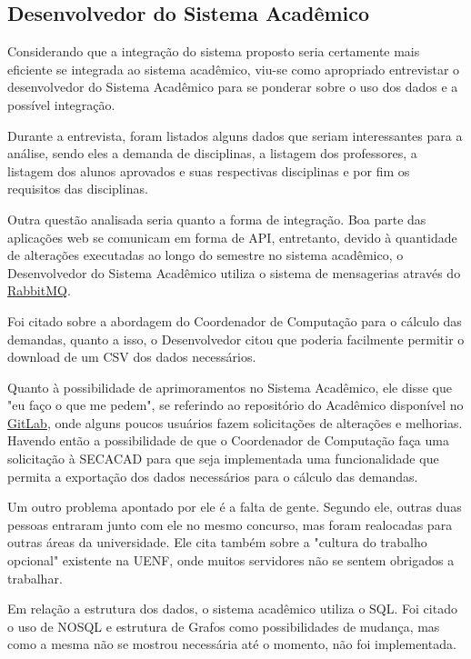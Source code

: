 \subsection{Desenvolvedor do Sistema Acadêmico} %

Considerando que a integração do sistema proposto seria certamente mais eficiente se integrada ao sistema acadêmico, viu-se como apropriado entrevistar o desenvolvedor do Sistema Acadêmico para se ponderar sobre o uso dos dados e a possível integração.

Durante a entrevista, foram listados alguns dados que seriam interessantes para a análise, sendo eles a demanda de disciplinas, a listagem dos professores, a listagem dos alunos aprovados e suas respectivas disciplinas e por fim os requisitos das disciplinas.


Outra questão analisada seria quanto a forma de integração. Boa parte das aplicações web se comunicam em forma de API, entretanto, devido à quantidade de alterações executadas ao longo do semestre no sistema acadêmico, o Desenvolvedor do Sistema Acadêmico utiliza o sistema de mensagerias através do \href{https://www.rabbitmq.com/}{RabbitMQ}.

Foi citado sobre a abordagem do Coordenador de Computação para o cálculo das demandas, quanto a isso, o Desenvolvedor citou que poderia facilmente permitir o download de um CSV dos dados necessários.

Quanto à possibilidade de aprimoramentos no Sistema Acadêmico, ele disse que "eu faço o que me pedem", se referindo ao repositório do Acadêmico disponível no \href{https://about.gitlab.com/}{GitLab}, onde alguns poucos usuários fazem solicitações de alterações e melhorias. Havendo então a possibilidade de que o Coordenador de Computação faça uma solicitação à SECACAD para que seja implementada uma funcionalidade que permita a exportação dos dados necessários para o cálculo das demandas.

Um outro problema apontado por ele é a falta de gente. Segundo ele, outras duas pessoas entraram junto com ele no mesmo concurso, mas foram realocadas para outras áreas da universidade. Ele cita também sobre a "cultura do trabalho opcional" existente na UENF, onde muitos servidores não se sentem obrigados a trabalhar.

Em relação a estrutura dos dados, o sistema acadêmico utiliza o SQL. Foi citado o uso de NOSQL e estrutura de Grafos como possibilidades de mudança, mas como a mesma não se mostrou necessária até o momento, não foi implementada.


